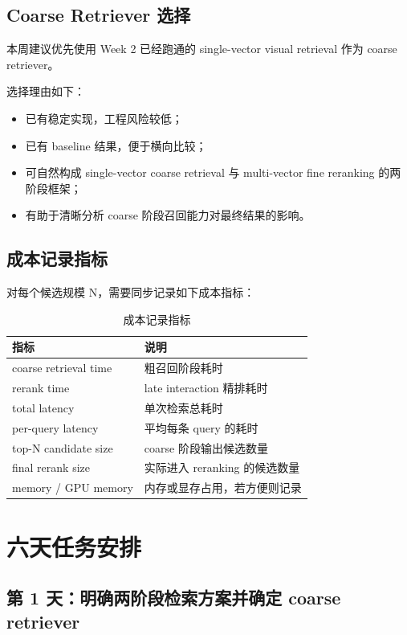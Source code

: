 \documentclass[UTF8,a4paper,12pt]{ctexart}
\begin{document}
	\subsection{Coarse Retriever 选择}
	
	本周建议优先使用 Week 2 已经跑通的 single-vector visual retrieval 作为 coarse retriever。
	
	选择理由如下：
	
	\begin{itemize}[leftmargin=2em]
		\item 已有稳定实现，工程风险较低；
		\item 已有 baseline 结果，便于横向比较；
		\item 可自然构成 single-vector coarse retrieval 与 multi-vector fine reranking 的两阶段框架；
		\item 有助于清晰分析 coarse 阶段召回能力对最终结果的影响。
	\end{itemize}
	
	\subsection{成本记录指标}
	
	对每个候选规模 N，需要同步记录如下成本指标：
	
	\begin{table}[H]
		\centering
		\caption{成本记录指标}
		\begin{tabular}{p{5cm}p{8cm}}
			\toprule
			\textbf{指标} & \textbf{说明} \\
			\midrule
			coarse retrieval time & 粗召回阶段耗时 \\
			rerank time & late interaction 精排耗时 \\
			total latency & 单次检索总耗时 \\
			per-query latency & 平均每条 query 的耗时 \\
			top-N candidate size & coarse 阶段输出候选数量 \\
			final rerank size & 实际进入 reranking 的候选数量 \\
			memory / GPU memory & 内存或显存占用，若方便则记录 \\
			\bottomrule
		\end{tabular}
	\end{table}
	
	\section{六天任务安排}
	
	\subsection{第 1 天：明确两阶段检索方案并确定 coarse retriever}
	
\end{document}
